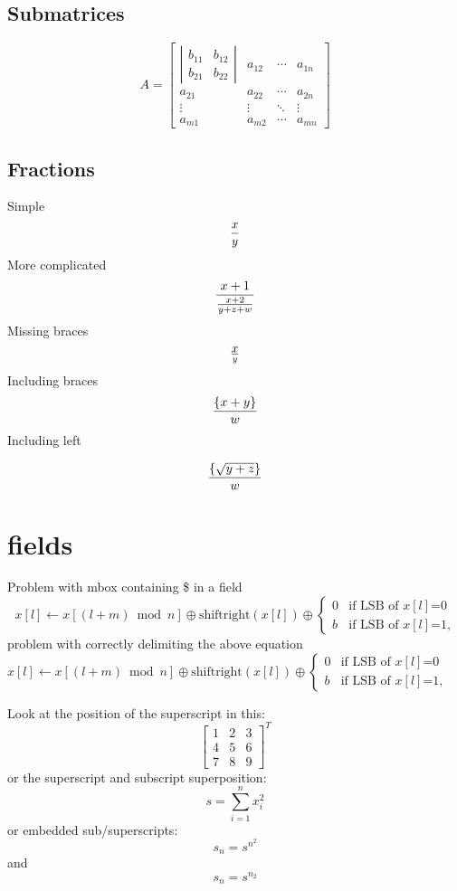 \documentclass{article}
\begin{document}
\subsection{Submatrices}
\[
A = \left[ \begin{array}{cccc}
\left|\begin{array}{cc}
b_{11}&b_{12}\\
b_{21}&b_{22}
\end{array}\right|
 & a_{12} & \cdots & a_{1n}\\
a_{21} & a_{22} & \cdots & a_{2n}\\
\vdots & \vdots & \ddots & \vdots\\
a_{m1} & a_{m2} & \cdots & a_{mn}
\end{array} \right]
\]

\subsection{Fractions}
Simple
\[
{x \over y}
\]
More complicated
\[
{x+1 \over {x+2 \over y+z +w}}
\]
Missing braces
\[
x \over y
\]
Including braces
\[
{\{ x+y \} \over w}
\]
Including left

\[
{\left\{\sqrt{y+z}\right\}\over w}
\]

\section{fields}
Problem with mbox containing \$ in a field
\[
x[l]\leftarrow x[(l+m) \bmod  n] \oplus \mbox{shiftright}(x[l])
 \oplus \left\{ \begin{array}{ll}
                0   & \mbox{if LSB of $x[l]$=0} \\
                b   & \mbox{if LSB of $x[l]$=1,}
               \end{array}
        \right.
\]
problem with correctly delimiting the above equation 
$
x[l]\leftarrow x[(l+m) \bmod  n] \oplus \mbox{shiftright}(x[l])
 \oplus \left\{ \begin{array}{ll}
                0   & \mbox{if LSB of $x[l]$=0} \\
                b   & \mbox{if LSB of $x[l]$=1,}
               \end{array}
        \right.
$

Look at the position of the superscript in this:
\[
  \left[
    \begin{array}{ccc}
      1 & 2 & 3\\
      4 & 5 & 6\\
      7 & 8 & 9
    \end{array}
  \right]^T
\]
or the superscript and subscript superposition:
\[
  s = \sum_{i=1}^n x^2_i
\]
or embedded sub/superscripts:
\[
  s_n=s^{n^2}
\]
and
\[
  s_n=s^{n_2}
\]
\end{document}
